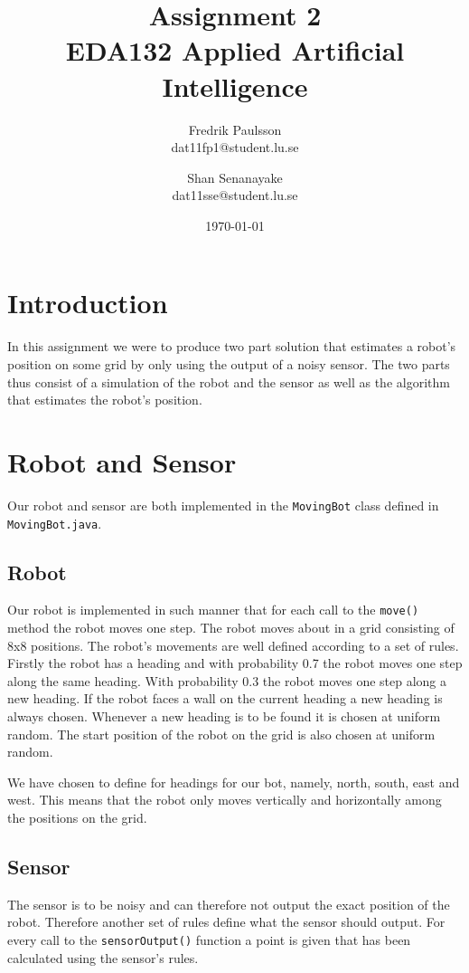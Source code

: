 \documentclass[a4paper]{article}
\title{Assignment 2 \\ EDA132 Applied Artificial Intelligence}
\date{\today}
\author{Fredrik Paulsson \\ dat11fp1@student.lu.se
\and Shan Senanayake \\ dat11sse@student.lu.se}
\begin{document}
\maketitle


\section{Introduction} In this assignment we were to produce two part solution
that estimates a robot's position on some grid by only using the output of a
noisy sensor. The two parts thus consist of a simulation of the robot and the
sensor as well as the algorithm that estimates the robot's position.

\section{Robot and Sensor}
Our robot and sensor are both implemented in the \texttt{MovingBot} class defined in \texttt{MovingBot.java}.

\subsection{Robot}
Our robot is implemented in such manner that for each call to the \texttt{move()} method the robot moves one step. The robot moves about in a grid consisting of 8x8 positions. The robot's movements are well defined according to a set of rules. Firstly the robot has a heading and with probability 0.7 the robot moves one step along the same heading. With probability 0.3 the robot moves one step along a new heading. If the robot faces a wall on the current heading a new heading is always chosen. Whenever a new heading is to be found it is chosen at uniform random. The start position of the robot on the grid is also chosen at uniform random.

We have chosen to define for headings for our bot, namely, north, south, east and west. This means that the robot only moves vertically and horizontally among the positions on the grid.

\subsection{Sensor}
The sensor is to be noisy and can therefore not output the exact position of the robot. Therefore another set of rules define what the sensor should output. For every call to the \texttt{sensorOutput()} function a point is given that has been calculated using the sensor's rules.
\end{document}
